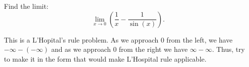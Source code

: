 \documentclass{ximera}
\author{Emma Smith Zbarsky}
\begin{document}
\begin{exercise}

Find the limit: \[\lim_{x \to 0} \left(\frac{1}{x} - \frac{1}{\sin(x)}\right).\]


\begin{hint}
This is a L'Hopital's rule problem. As we approach 0 from the left, we
have $-\infty - (-\infty)$ and as we approach 0 from the right we have
$\infty-\infty$. Thus, try to make it in the form that would make L'Hospital rule applicable.  
\end{hint}


\begin{multipleChoice}
\choice{$-\infty$}
\choice{$\infty$}
\end{multipleChoice}

\end{exercise}
\end{document}
